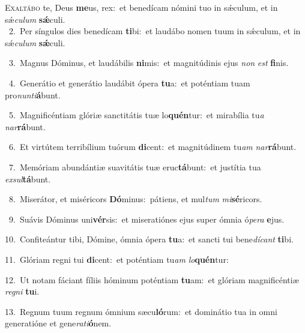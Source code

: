\lettrine{\initial\textcolor{\initialcolor}{E}}{xaltábo} te, Deus \textbf{me}\-us, rex:~\star et benedícam nómini tuo in sǽculum, et in sǽ\-\textit{cu}\-\textit{lum} \textbf{sǽ}\-culi.\\
{\numbfont\textcolor{\numbcolor}{~2.}}~Per síngulos dies benedícam \textbf{ti}\-bi:~\star et laudábo nomen tuum in sǽculum, et in sǽ\-\textit{cu}\-\textit{lum} \textbf{sǽ}\-culi.\par
{\numbfont\textcolor{\numbcolor}{~3.}}~Magnus Dóminus, et laudábilis \textbf{ni}\-mis:~\star et magnitúdinis ejus \textit{non} \textit{est} \textbf{fi}\-nis.\par
{\numbfont\textcolor{\numbcolor}{~4.}}~Generátio et generátio laudábit ópera \textbf{tu}\-a:~\star et poténtiam tuam pro\-\textit{nun}\-\textit{ti}\textbf{á}bunt.\par
{\numbfont\textcolor{\numbcolor}{~5.}}~Magnificéntiam glóriæ sanctitátis tuæ lo\-\textbf{quén}\-tur:~\star et mirabília tu\textit{a} \textit{nar}\-\textbf{rá}bunt.\par
{\numbfont\textcolor{\numbcolor}{~6.}}~Et virtútem terribílium tuórum \textbf{di}\-cent:~\star et magnitúdinem tu\textit{am} \textit{nar}\-\textbf{rá}bunt.\par
{\numbfont\textcolor{\numbcolor}{~7.}}~Memóriam abundántiæ suavitátis tuæ eruc\-\textbf{tá}\-bunt:~\star et justítia tua \textit{ex}\-\textit{sul}\textbf{tá}bunt.\par
{\numbfont\textcolor{\numbcolor}{~8.}}~Miserátor, et miséricors \textbf{Dó}\-minus:~\star pátiens, et mul\textit{tum} \textit{mi}\-\textbf{sé}ricors.\par
{\numbfont\textcolor{\numbcolor}{~9.}}~Suávis Dóminus uni\-\textbf{vér}\-sis:~\star et miseratiónes ejus super ómnia ó\-\textit{pe}\-\textit{ra} \textbf{e}\-jus.\par
{\numbfont\textcolor{\numbcolor}{10.}}~Confiteántur tibi, Dómine, ómnia ópera \textbf{tu}\-a:~\star et sancti tui bene\-\textit{dí}\-\textit{cant} \textbf{ti}\-bi.\par
{\numbfont\textcolor{\numbcolor}{11.}}~Glóriam regni tui \textbf{di}\-cent:~\star et poténtiam tu\textit{am} \textit{lo}\-\textbf{quén}tur:\par
{\numbfont\textcolor{\numbcolor}{12.}}~Ut notam fáciant fíliis hóminum poténtiam \textbf{tu}\-am:~\star et glóriam magnificéntiæ \textit{re}\-\textit{gni} \textbf{tu}\-i.\par
{\numbfont\textcolor{\numbcolor}{13.}}~Regnum tuum regnum ómnium sæcu\-\textbf{ló}\-rum:~\star et dominátio tua in omni generatióne et gene\-\textit{ra}\-\textit{ti}\textbf{ó}nem.\par
